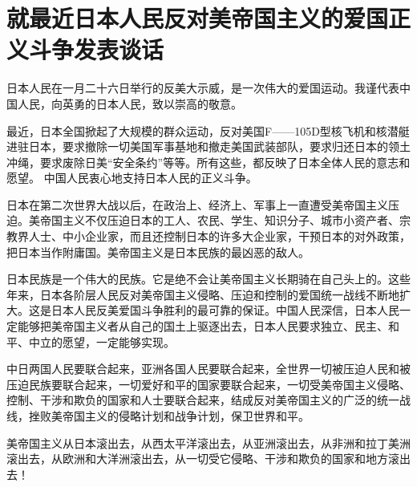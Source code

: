 \section[就最近日本人民反对美帝国主义的爱国正义斗争发表谈话（一九六四年一月二十七日）]{就最近日本人民反对美帝国主义的爱国正义斗争发表谈话}


日本人民在一月二十六日举行的反美大示威，是一次伟大的爱国运动。我谨代表中国人民，向英勇的日本人民，致以崇高的敬意。

最近，日本全国掀起了大规模的群众运动，反对美国F——105D型核飞机和核潜艇进驻日本，要求撤除一切美国军事基地和撤走美国武装部队，要求归还日本的领土冲绳，要求废除日美“安全条约”等等。所有这些，都反映了日本全体人民的意志和愿望。
中国人民衷心地支持日本人民的正义斗争。

日本在第二次世界大战以后，在政治上、经济上、军事上一直遭受美帝国主义压迫。美帝国主义不仅压迫日本的工人、农民、学生、知识分子、城市小资产者、宗教界人士、中小企业家，而且还控制日本的许多大企业家，干预日本的对外政策，把日本当作附庸国。美帝国主义是日本民族的最凶恶的敌人。

日本民族是一个伟大的民族。它是绝不会让美帝国主义长期骑在自己头上的。这些年来，日本各阶层人民反对美帝国主义侵略、压迫和控制的爱国统一战线不断地扩大。这是日本人民反美爱国斗争胜利的最可靠的保证。中国人民深信，日本人民一定能够把美帝国主义者从自己的国土上驱逐出去，日本人民要求独立、民主、和平、中立的愿望，一定能够实现。

中日两国人民要联合起来，亚洲各国人民要联合起来，全世界一切被压迫人民和被压迫民族要联合起来，一切爱好和平的国家要联合起来，一切受美帝国主义侵略、控制、干涉和欺负的国家和人士要联合起来，结成反对美帝国主义的广泛的统一战线，挫败美帝国主义的侵略计划和战争计划，保卫世界和平。

美帝国主义从日本滚出去，从西太平洋滚出去，从亚洲滚出去，从非洲和拉丁美洲滚出去，从欧洲和大洋洲滚出去，从一切受它侵略、干涉和欺负的国家和地方滚出去！


